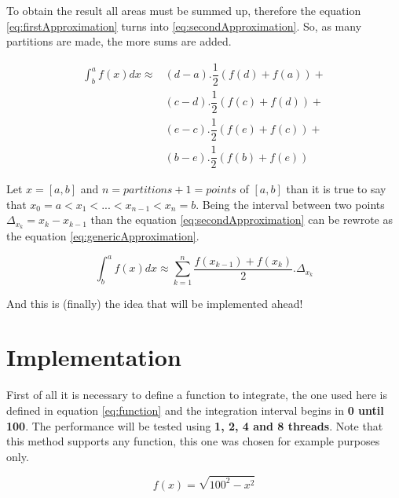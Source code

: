	\par To obtain the result all areas must be summed up, therefore the equation \ref{eq:firstApproximation} turns into \ref{eq:secondApproximation}. So, as many partitions are made, the more sums are added.\newline
	
	\begin{equation}
		\begin{aligned}
			\int^a_b{f(x) dx} \approx 
			&(d-a).\dfrac{1}{2}(f(d)+f(a))+\\
			&(c-d).\dfrac{1}{2}(f(c)+f(d))+\\
			&(e-c).\dfrac{1}{2}(f(e)+f(c))+\\
			&(b-e).\dfrac{1}{2}(f(b)+f(e))
		\end{aligned}
		\label{eq:secondApproximation}
	\end{equation}

	\par Let $x = [a,b]$ and $n=partitions+1=points$ of $[a,b]$ than it is true to say that $x_0 = a < x_1 < ... < x_{n-1} < x_n = b$. Being the interval between two points $\Delta_{x_k} = x_k - x_{k-1}$ than the equation \ref*{eq:secondApproximation} can be rewrote as the equation \ref{eq:genericApproximation}.\newline
	
	\begin{equation}
		\int^a_b{f(x) dx} \approx \sum_{k=1}^{n} \dfrac{f(x_{k-1})+f(x_k)}{2} . \Delta_{x_k}
		\label{eq:genericApproximation}
	\end{equation}

	\par And this is (finally) the idea that will be implemented ahead!
	
	\section{Implementation}
		\par First of all it is necessary to define a function to integrate, the one used here is defined in equation \ref{eq:function} and the integration interval begins in \textbf{0 until 100}. The performance will be tested using \textbf{1, 2, 4 and 8 threads}.  Note that this method supports any function, this one was chosen for example purposes only.\newline
		
		\begin{equation}
			f(x) = \sqrt{100^2 - x^2}
			\label{eq:function}
		\end{equation}		
		
